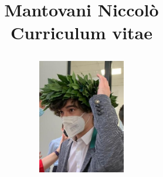 \documentclass[a4paper,11pt]{article}
\begin{document}
	\title{
	
		\hspace{5mm}
		\begin{minipage}[b]{0.4\textwidth}
			Mantovani Niccolò \\
			\large Curriculum vitae
		\end{minipage}
		\hfill
		\hfill
		\begin{minipage}[b]{0.4\textwidth}
			\includegraphics[width=1.5in]{src/img/profile.jpeg}     
		\end{minipage}

		\vspace{5mm}
		}
	\date{}
	\maketitle
	
	
	\vspace{1mm}
	
	\vspace{1mm}
	
	\newpage
	
	\vspace{1mm}
	
	\vspace{1mm}
	
\end{document}
